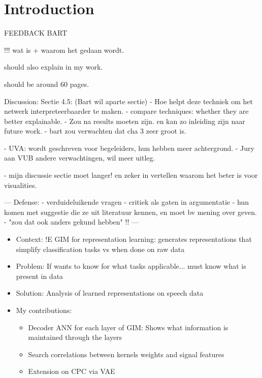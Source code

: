 \chapter{Introduction}
\setcounter{page}{1} %


FEEDBACK BART

!!!
wat is + waarom het gedaan wordt.

should also explain in my work.

should be around 60 pages.

Discussion:
Sectie 4.5: (Bart wil aparte sectie)
- Hoe helpt deze techniek om het netwerk interpreteerbaarder te maken.
- compare techniques: whether they are better explainable.
- Zou na results moeten zijn. en kan zo inleiding zijn naar future work.
- bart zou verwachten dat cha 3 zeer groot is.

- UVA: wordt geschreven voor begeleiders, hun hebben meer achtergrond.
- Jury aan VUB andere verwachtingen, wil meer uitleg.

- mijn discussie sectie moet langer! en zeker in vertellen waarom het beter is voor visualities.

---
Defense:
- verduideluikende vragen
- critiek als gaten in argumentatie
- hun komen met suggestie die ze uit literatuur kennen, en moet bv mening over geven.
- "zou dat ook anders gekund hebben"
!!
---




\begin{itemize}
	\item Context: !E GIM for representation learning: generates representations that simplify classification tasks vs when done on raw data
	\item Problem: If wants to know for what tasks applicable... must know what is present in data
	\item Solution: Analysis of learned representations on speech data
	\item My contributions: 
	\begin{itemize}
		\item Decoder ANN for each layer of GIM: Shows what information is maintained through the layers
		\item Search correlations between kernels weights and signal features
		\item Extension on CPC via VAE
	\end{itemize}
\end{itemize}



